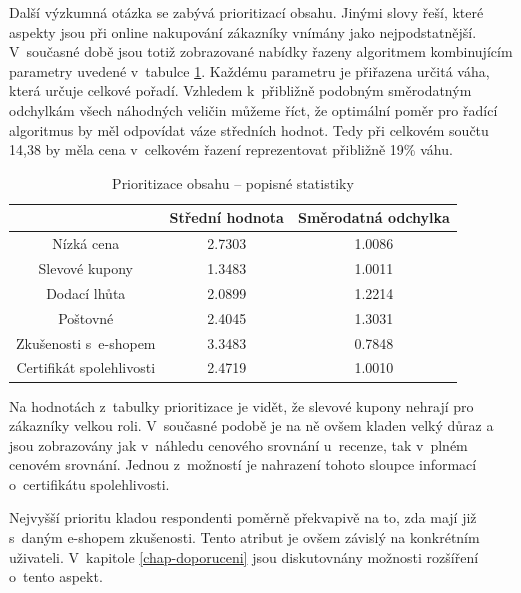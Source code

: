 \documentclass[12pt,twoside,openany]{fithesis}
\begin{document}
      Další výzkumná otázka se zabývá prioritizací obsahu. Jinými 
slovy řeší, které aspekty jsou při online nakupování zákazníky 
vnímány jako nejpodstatnější. V~současné době jsou totiž zobrazované 
nabídky řazeny algoritmem kombinujícím parametry uvedené v~tabulce 
\hyperlink{tab-prioritizace}{\ref{tab-prioritizace}}. Každému parametru je přiřazena určitá 
váha, která určuje celkové pořadí. Vzhledem k~přibližně podobným 
směrodatným odchylkám všech náhodných veličin můžeme říct, že 
optimální poměr pro řadící algoritmus by měl odpovídat váze 
středních hodnot. Tedy při celkovém součtu 14,38 by měla cena v~celkovém 
řazení reprezentovat přibližně 19\% váhu.

      \begin{table}[htb]
          \begin{center}%
              \begin{tabular}{|c|c|c|}
                  \hline 
                  {{}} & {{Střední hodnota}} & {{Směrodatná odchylka}} 
\tabularnewline
                   \hline 
                   {{Nízká cena}} & {{2.7303}} & {{1.0086}} \tabularnewline
                    \hline 
                    {{Slevové kupony}} & {{1.3483}} & {{1.0011}} 
\tabularnewline
                     \hline 
                     {{Dodací lhůta}} & {{2.0899}} & {{1.2214}} 
\tabularnewline
                      \hline 
                      {{Poštovné}} & {{2.4045}} & {{1.3031}} \tabularnewline
                       \hline 
                       {{Zkušenosti s~e-shopem}} & {{3.3483}} & {{0.7848}} 
\tabularnewline
                        \hline 
                        {{Certifikát spolehlivosti}} & {{2.4719}} & {{1.0010}} 
\tabularnewline
                        \hline 
                    \end{tabular}
                    \caption{Prioritizace obsahu -- popisné statistiky}\label{tab-prioritizace}
                \end{center}
            \end{table}

            Na hodnotách z~tabulky prioritizace je vidět, že slevové kupony 
nehrají pro zákazníky velkou roli. V~současné podobě je na ně ovšem 
kladen velký důraz a jsou zobrazovány jak v~náhledu cenového srovnání 
u~recenze, tak v~plném cenovém srovnání. Jednou z~možností je nahrazení 
tohoto sloupce informací o~certifikátu spolehlivosti.

            Nejvyšší prioritu kladou respondenti poměrně překvapivě na 
to, zda mají již s~daným e-shopem zkušenosti. Tento atribut je ovšem 
závislý na konkrétním uživateli. V~kapitole 
\hyperlink{chap-doporuceni}{{\ref{chap-doporuceni}}} jsou diskutovnány 
možnosti rozšíření o~tento aspekt.
\end{document}

